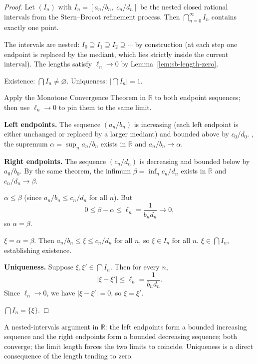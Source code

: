 \begin{proof}
\Claim Let $(I_n)$ with $I_n = [a_n/b_n,\; c_n/d_n]$ be the nested
closed rational intervals from the Stern--Brocot refinement process.
Then $\bigcap_{n=0}^{\infty} I_n$ contains exactly one point.

\Given The intervals are nested: $I_0 \supseteq I_1 \supseteq I_2 \supseteq \cdots$
by construction (at each step one endpoint is replaced by the mediant,
which lies strictly inside the current interval). The lengths satisfy
$\ell_n \to 0$ by Lemma~\ref{lem:sb-length-zero}.

\Goal Existence: $\bigcap I_n \ne \varnothing$.
Uniqueness: $|\bigcap I_n| = 1$.

\Strategy Apply the Monotone Convergence Theorem in $\mathbb{R}$ to both
endpoint sequences; then use $\ell_n \to 0$ to pin them to the same limit.

\textbf{Left endpoints.} The sequence $(a_n/b_n)$ is increasing
(each left endpoint is either unchanged or replaced by a larger mediant)
and bounded above by $c_0/d_0$. , the supremum $\alpha = \sup_n a_n/b_n$ exists in
$\mathbb{R}$ and $a_n/b_n \to \alpha$.

\textbf{Right endpoints.} The sequence $(c_n/d_n)$ is decreasing
and bounded below by $a_0/b_0$.  By the same theorem, the infimum
$\beta = \inf_n c_n/d_n$ exists in $\mathbb{R}$ and $c_n/d_n \to \beta$.

\Therefore $\alpha \le \beta$ (since $a_n/b_n \le c_n/d_n$ for all $n$).
But
\[
  0 \le \beta - \alpha \le \ell_n = \frac{1}{b_n d_n} \to 0,
\]
so $\alpha = \beta$.

\Let $\xi = \alpha = \beta$. Then $a_n/b_n \le \xi \le c_n/d_n$ for
all $n$, so $\xi \in I_n$ for all $n$.
\Therefore $\xi \in \bigcap I_n$, establishing existence.

\textbf{Uniqueness.} Suppose $\xi, \xi' \in \bigcap I_n$.
Then for every $n$,
\[
  |\xi - \xi'| \le \ell_n = \frac{1}{b_n d_n}.
\]
Since $\ell_n \to 0$, we have $|\xi - \xi'| = 0$, so $\xi = \xi'$.

\Hence $\bigcap I_n = \{\xi\}$. \AsReq
\end{proof}

\begin{remark*}
A nested-intervals argument in $\mathbb{R}$: the left endpoints form a
bounded increasing sequence and the right endpoints form a bounded decreasing
sequence; both converge; the limit length forces the two limits to coincide.
Uniqueness is a direct consequence of the length tending to zero.
\end{remark*}

